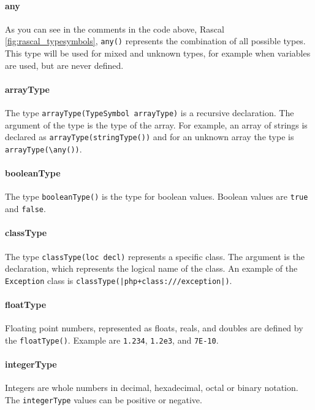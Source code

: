 \documentclass[../main.tex]{subfiles}
\begin{document}
    \paragraph{any} 
    As you can see in the comments in the code above, Rascal \ref{fig:rascal_typesymbols}, \texttt{any()} represents the combination of all possible types. 
    This type will be used for mixed and unknown types, for example when variables are used, but are never defined.
    
    \paragraph{arrayType}
    The type \texttt{arrayType(TypeSymbol arrayType)} is a recursive declaration.
    The argument of the type is the type of the array. 
    For example, an array of strings is declared as \texttt{arrayType(stringType())} and for an unknown array the type is \texttt{arrayType(\textbackslash{}any())}.
    
    \paragraph{booleanType}
    The type \texttt{booleanType()} is the type for boolean values.
    Boolean values are \texttt{true} and \texttt{false}.
    
    \paragraph{classType}
    The type \texttt{classType(loc decl)} represents a specific class.
    The argument is the declaration, which represents the logical name of the class. 
    An example of the \texttt{Exception} class is \texttt{classType(|php+class:///exception|)}.
    
    \paragraph{floatType}
    Floating point numbers, represented as floats, reals, and doubles are defined by the \texttt{floatType()}.
    Example are \texttt{1.234}, \texttt{1.2e3}, and \texttt{7E-10}.
    
    \paragraph{integerType}
    Integers are whole numbers in decimal, hexadecimal, octal or binary notation.
    The \texttt{integerType} values can be positive or negative.
    
\end{document}
